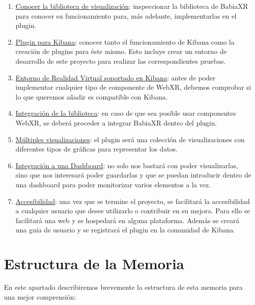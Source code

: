\documentclass[a4paper, 12pt]{book}
\begin{document}
\begin{enumerate}
    \item \underline{Conocer la biblioteca de visualización}: inspeccionar la biblioteca de BabiaXR para conocer su funcionamiento para, más adelante, implementarlas en el plugin.
    \item \underline{Plugin para Kibana}: conocer tanto el funcionamiento de Kibana como la creación de plugins para éste mismo. Esto incluye crear un entorno de desarrollo de este proyecto para realizar las correspondientes pruebas.
    \item \underline{Entorno de Realidad Virtual soportado en Kibana}: antes de poder implementar cualquier tipo de componente de WebXR, debemos comprobar si lo que queremos añadir es compatible con Kibana.
    \item \underline{Integración de la biblioteca}: en caso de que sea posible usar componentes WebXR, se deberá proceder a integrar BabiaXR dentro del plugin.
    \item \underline{Múltiples visualizaciones}: el plugin será una colección de visualizaciones con diferentes tipos de gráficas para representar los datos.
    \item \underline{Integración a una Dashboard}: no solo nos bastará con poder visualizarlas, sino que nos interesará poder guardarlas y que se puedan introducir dentro de una dashboard para poder monitorizar varios elementos a la vez.
    \item \underline{Accesibilidad}: una vez que se termine el proyecto, se facilitará la accesibilidad a cualquier usuario que desee utilizarlo o contribuir en su mejora. Para ello se facilitará una web y se hospedará en alguna plataforma. Además se creará una guía de usuario y se registrará el plugin en la comunidad de Kibana.
\end{enumerate}


\section{Estructura de la Memoria}
\label{sec:estructuramemoria}

En este apartado describiremos brevemente la estructura de esta memoria para una mejor comprensión:
\end{document}
